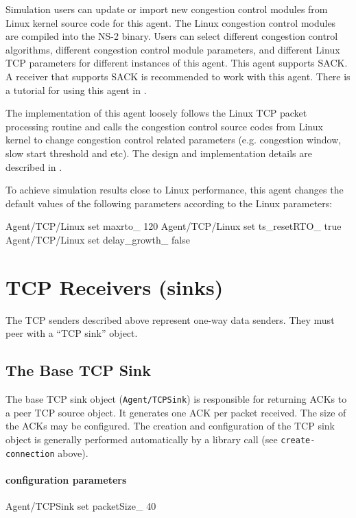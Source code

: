 Simulation users can update or import new congestion control modules from Linux kernel source code for this agent.
The Linux congestion control modules are compiled into the NS-2 binary. Users can select different congestion control algorithms, different
congestion control module parameters, and different Linux TCP parameters for different instances of this agent.
This agent supports SACK. A receiver that supports SACK is recommended to work with this agent.
There is a tutorial for using this agent in \cite{Wei07NSLinuxTutorial}.

The implementation of this agent loosely follows the Linux TCP packet processing routine and calls the congestion control source
codes from Linux kernel to change congestion control related parameters (e.g. congestion window, slow start threshold and etc).
The design and implementation details are described in \cite{WeiCao06NSLinuxTCP}.

To achieve simulation results close to Linux performance, this agent changes the default values of the following parameters
according to the Linux parameters: 
\begin{program}
Agent/TCP/Linux set maxrto_ 120
Agent/TCP/Linux set ts_resetRTO_ true
Agent/TCP/Linux set delay_growth_ false
\end{program}

\section{TCP Receivers (sinks)}

The TCP senders described above represent one-way data senders.
They must peer with a ``TCP sink'' object.

\subsection{The Base TCP Sink}

The base TCP sink object ({\tt Agent/TCPSink})
is responsible for returning ACKs to
a peer TCP source object.
It generates one ACK per packet received.
The size of the ACKs may be configured.
The creation and configuration of the TCP sink object
is generally performed automatically by a library
call (see {\tt create-connection} above).

\paragraph{configuration parameters}
\begin{program}
        Agent/TCPSink set packetSize_ 40
\end{program}

